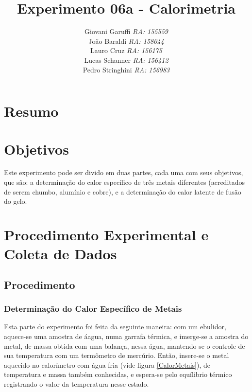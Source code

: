 \documentclass[12pt,a4paper]{article}
\begin{document}
\title{\vspace{70mm}\Huge Experimento 06a - Calorimetria}
\author{ Giovani Garuffi\qquad\hfill
		\textit {RA: 155559}\protect\\
		João Baraldi\hfill
		\textit{RA: 158044}\protect\\
		Lauro Cruz\hfill
		\textit{RA: 156175}\protect\\
		Lucas Schanner\hfill
		\textit{RA: 156412}\protect\\
		Pedro Stringhini\hfill
		\textit {RA: 156983}								
		}
\maketitle
\newpage
\section{Resumo}

\section{Objetivos}
Este experimento pode ser divido em duas partes, cada uma com seus objetivos, que são: a determinação do calor específico de três metais diferentes (acreditados de serem chumbo, alumínio e cobre), e a determinação do calor latente de fusão do gelo. 


\section{Procedimento Experimental e Coleta de Dados}


\subsection{Procedimento}


\subsubsection{Determinação do Calor Específico de Metais}


Esta parte do experimento foi feita da seguinte maneira: com um ebulidor, aquece-se uma amostra de áagua, numa garrafa térmica, e imerge-se a amostra do metal, de massa obtida com uma balança, nessa água, mantendo-se o controle de sua temperatura com um termômetro de mercúrio. Então, insere-se o metal aquecido no calorímetro com água fria (vide figura \ref{CalorMetais}), de temperatura e massa também conhecidas, e espera-se pelo equílibrio térmico registrando o valor da temperatura nesse estado.
\end{document}
